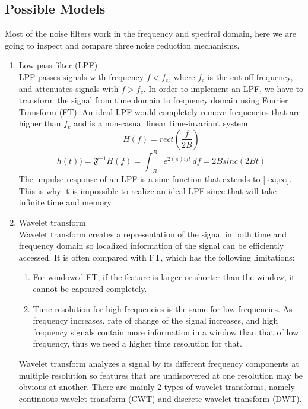 \subsection{Possible Models}
Most of the noise filters work in the frequency and spectral domain, here we are going to inspect and
compare three noise reduction mechanisms.

\begin{enumerate}
	\item Low-pass filter (LPF)\\
	LPF passes signals with frequency \(f<f_{c}\), where \(f_{c}\) is the cut-off frequency, and attenuates
	signals with \(f>f_{c}\). 
	In order to implement an LPF, we have to transform the signal from time domain to 
	frequency domain using Fourier Transform (FT). An ideal LPF would completely remove frequencies that are
	higher than \(f_{c}\) and is a non-casual linear time-invariant system. 
	\[H(f) = rect(\frac{f}{2B})\]
	\[h(t))= \mathfrak{F}^{-1}{H(f)} = \int_{-B}^{B} e^{2(\pi)ift}\,df = 2Bsinc(2Bt)\]
	The impulse response of an LPF is a sinc function that extends to [-$\infty$,$\infty$]. This is why it is 
	impossible to realize an ideal LPF since that will take infinite time and memory.

	\item Wavelet transform\\
	Wavelet transform creates a representation of the signal in both time and frequency domain so localized 
	information of the signal can be efficiently accessed. It is often compared with FT, which
	has the following limitations: 
	\begin{enumerate}
		\item For windowed FT, if the feature is larger or shorter than the window, it cannot be captured completely.
		\item Time resolution for high frequencies is the same for low frequencies. As frequency increases, rate of 
		change of the signal increases, and high frequency signals contain more information in a window than that of 
		low frequency, thus we need a higher time resolution for that.
	\end{enumerate}
	Wavelet transform analyzes a signal by its different frequency components at multiple resolution so features that are 
	undiscovered at one resolution may be obvious at another. There are mainly 2 types of wavelet transforms, namely 
	continuous wavelet transform (CWT) and discrete wavelet transform (DWT).
	

\end{enumerate}
